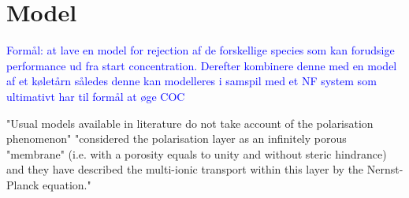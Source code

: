 \section{Model}

\textcolor{blue}{Formål: at lave en model for rejection af de forskellige species som kan forudsige performance ud fra start concentration. Derefter kombinere denne med en model af et køletårn således denne kan modelleres i samspil med et NF system som ultimativt har til formål at øge COC}




"Usual models available in literature do not take account of the polarisation
phenomenon"
"considered the polarisation
layer as an infinitely porous "membrane" (i.e. with a porosity
equals to unity and without steric hindrance) and they have
described the multi-ionic transport within this layer by the
Nernst-Planck equation." 
 \citep{deonConcentrationPolarizationPhenomenon2013}
 
 


	


